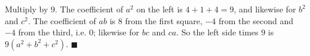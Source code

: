 Multiply by $9$. The coefficient of $a^2$ on the left is $4+1+4=9$, and likewise for $b^2$ and $c^2$. The coefficient of $ab$ is $8$ from the first square, $-4$ from the second and $-4$ from the third, i.e. $0$; likewise for $bc$ and $ca$. So the left side times $9$ is $9(a^2+b^2+c^2)$. $\blacksquare$
